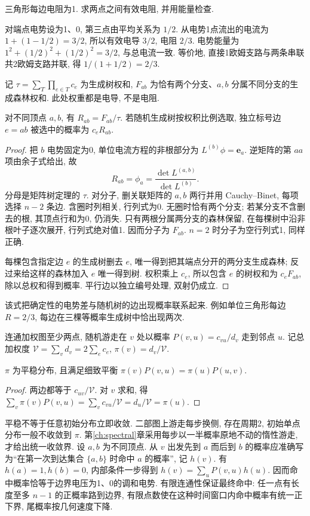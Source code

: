 \begin{example}
三角形每边电阻为1. 求两点之间有效电阻, 并用能量检查.
\end{example}
\begin{solution}
对端点电势设为1、0, 第三点由平均关系为 $1/2$. 从电势1点流出的电流为 $1+(1-1/2)=3/2$, 所以有效电导 $3/2$, 电阻 $2/3$. 电势能量为 $1^2+(1/2)^2+(1/2)^2=3/2$, 与总电流一致. 等价地, 直接1欧姆支路与两条串联共2欧姆支路并联, 得 $1/(1+1/2)=2/3$.
\end{solution}
记 $\tau=\sum_T\prod_{e\in T}c_e$ 为生成树权和, $F_{ab}$ 为恰有两个分支、$a,b$ 分属不同分支的生成森林权和. 此处权重都是电导, 不是电阻.
\begin{theorem}\label{thm:forestresistance}
对不同顶点 $a,b$, 有 $R_{ab}=F_{ab}/\tau$. 若随机生成树按权积比例选取, 独立标号边 $e=ab$ 被选中的概率为 $c_eR_{ab}$.
\end{theorem}
\begin{proof}
把 $b$ 电势固定为0, 单位电流方程的非根部分为 $L^{(b)}\phi=\mathbf e_a$. 逆矩阵的第 $aa$ 项由余子式给出, 故
\[
R_{ab}=\phi_a=\frac{\det L^{(a,b)}}{\det L^{(b)}}.
\]
分母是矩阵树定理的 $\tau$. 对分子, 删关联矩阵的 $a,b$ 两行并用 Cauchy--Binet, 每项选择 $n-2$ 条边. 含圈时列相关, 行列式为0. 无圈时恰有两个分支; 若某分支不含删去的根, 其顶点行和为0, 仍消失. 只有两根分属两分支的森林保留, 在每棵树中沿非根叶子逐次展开, 行列式绝对值1. 因而分子为 $F_{ab}$. $n=2$ 时分子为空行列式1, 同样正确.

每棵包含指定边 $e$ 的生成树删去 $e$, 唯一得到把其端点分开的两分支生成森林; 反过来给这样的森林加入 $e$ 唯一得到树. 权积乘上 $c_e$, 所以包含 $e$ 的树权和为 $c_eF_{ab}$, 除以总权和得到概率. 平行边以独立编号处理, 双射仍成立.
\end{proof}
该式把确定性的电势差与随机树的边出现概率联系起来. 例如单位三角形每边 $R=2/3$, 每边在三棵等概率生成树中恰出现两次.
\begin{definition}
连通加权图至少两点, 随机游走在 $v$ 处以概率 $P(v,u)=c_{vu}/d_v$ 走到邻点 $u$. 记总加权度 $\mathcal V=\sum_v d_v=2\sum_e c_e$, $\pi(v)=d_v/\mathcal V$.
\end{definition}
\begin{proposition}
$\pi$ 为平稳分布, 且满足细致平衡 $\pi(v)P(v,u)=\pi(u)P(u,v)$.
\end{proposition}
\begin{proof}
两边都等于 $c_{uv}/\mathcal V$. 对 $v$ 求和, 得 $\sum_v\pi(v)P(v,u)=\sum_v c_{vu}/\mathcal V=d_u/\mathcal V=\pi(u)$.
\end{proof}
平稳不等于任意初始分布立即收敛. 二部图上游走每步换侧, 存在周期2, 初始单点分布一般不收敛到 $\pi$. 第\ref{ch:spectral}章采用每步以一半概率原地不动的惰性游走, 才给出统一收敛界.
设 $a,b$ 为不同顶点. 从 $v$ 出发先到 $a$ 而后到 $b$ 的概率应准确写为“在第一次到达集合 $\{a,b\}$ 时命中 $a$ 的概率”, 记 $h(v)$. 有 $h(a)=1,h(b)=0$, 内部条件一步得到 $h(v)=\sum_uP(v,u)h(u)$. 因而命中概率恰等于边界电压为1、0的调和电势. 有限连通性保证最终命中: 任一点有长度至多 $n-1$ 的正概率路到边界, 有限点数使在这种时间窗口内命中概率有统一正下界, 尾概率按几何速度下降.

